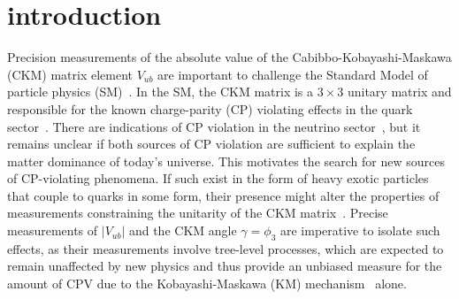 \documentclass[twocolumn,aps,prd,superscriptaddress,nofootinbib,floatfix,preprintnumbers,a4]{revtex4-1}
\begin{document}
\maketitle


\section{introduction}

Precision measurements of the absolute value of the Cabibbo-Kobayashi-Maskawa (CKM) matrix element $V_{ub}$ are important to challenge the Standard Model of particle physics (SM)~\cite{PhysRevLett.10.531,km_paper}. In the SM, the CKM matrix is a $3 \times 3$ unitary matrix and responsible for the known charge-parity (CP) violating effects in the quark sector~\cite{pdg_ckm:2020}. There are indications of CP violation in the neutrino sector~\cite{Abe:2019vii}, but it remains unclear if both sources of CP violation are sufficient to explain the matter dominance of today's universe. This motivates the search for new sources of CP-violating phenomena. If such exist in the form of heavy exotic particles that couple to quarks in some form, their presence might alter the properties of measurements constraining the unitarity of the CKM matrix~\cite{Kou:2018nap}. Precise measurements of $|V_{ub}|$ and the CKM angle $\gamma = \phi_3$ are imperative to isolate such effects, as their measurements involve tree-level processes, which are expected to remain unaffected by new physics and thus provide an unbiased measure for the amount of CPV due to the Kobayashi-Maskawa (KM) mechanism~\cite{km_paper} alone. 
\end{document}
